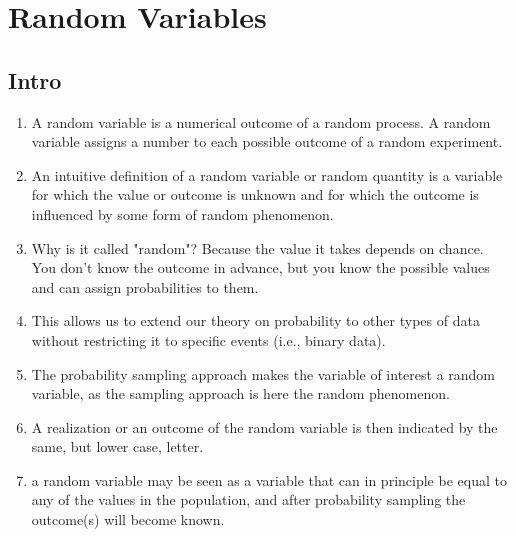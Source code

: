 \chapter{Random Variables}

\section{Intro}


\begin{enumerate}
    \item A random variable is a numerical outcome of a random process.
    A random variable assigns a number to each possible outcome of a random experiment.
    \hfill \cite{common/online/chatgpt}

    \item An intuitive definition of a random variable or random quantity is a variable for which the value or outcome is unknown and for which the outcome is influenced by some form of random phenomenon.
    \hfill \cite{statistics/book/Statistics-for-Data-Scientists/Maurits-Kaptein}

    \item Why is it called "random"?
    Because the value it takes depends on chance.
    You don’t know the outcome in advance, but you know the possible values and can assign probabilities to them.
    \hfill \cite{common/online/chatgpt}

    \item This allows us to extend our theory on probability to other types of data without restricting it to specific events (i.e., binary data).
    \hfill \cite{statistics/book/Statistics-for-Data-Scientists/Maurits-Kaptein}

    \item The probability sampling approach makes the variable of interest a random variable, as the sampling approach is here the random phenomenon.
    \hfill \cite{statistics/book/Statistics-for-Data-Scientists/Maurits-Kaptein}

    \item A realization or an outcome of the random variable is then indicated by the same, but lower case, letter.
    \hfill \cite{statistics/book/Statistics-for-Data-Scientists/Maurits-Kaptein}

    \item a random variable may be seen as a variable that can in principle be equal to any of the values in the population, and after probability sampling the outcome(s) will become known.
    \hfill \cite{statistics/book/Statistics-for-Data-Scientists/Maurits-Kaptein}


\end{enumerate}
